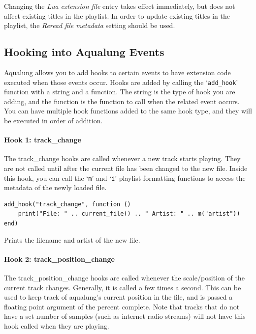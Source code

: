 \documentclass[10pt,english]{article}
\begin{document}
\noindent Changing the \textsl{Lua extension file} entry
takes effect immediately, but does not affect existing titles
in the playlist. In order to update existing titles in the
playlist, the \textsl{Reread file metadata} setting should
be used.




\subsection{Hooking into Aqualung Events\label{idp2005968}}



\noindent Aqualung allows you to add hooks to certain events to
have extension code executed when those events occur.
Hooks are added by calling the `\texttt{add\_hook}'
function with a string and a function.  The string is the
type of hook you are adding, and the function is the
function to call when the related event occurs.
You can have multiple hook functions added to the same
hook type, and they will be executed in order of addition.


\paragraph*{Hook 1: track\_change}



\noindent The track\_change hooks are called whenever a new track
starts playing.  They are not called until after the
current file has been changed to the new file. Inside
this hook, you can call the `\texttt{m}' and
`\texttt{i}' playlist formatting functions to
access the metadata of the newly loaded file.


\begin{verbatim}
add_hook("track_change", function ()
    print("File: " .. current_file() .. " Artist: " .. m("artist"))
end)
\end{verbatim}



\noindent Prints the filename and artist of the new file.




\paragraph*{Hook 2: track\_position\_change}



\noindent The track\_position\_change hooks are called whenever the
scale/position of the current track changes.  Generally,
it is called a few times a second.  This can be used to
keep track of aqualung's current position in the file,
and is passed a floating point argument of the percent
complete.  Note that tracks that do not have a set
number of samples (such as internet radio streams) will
not have this hook called when they are playing.
\end{document}
